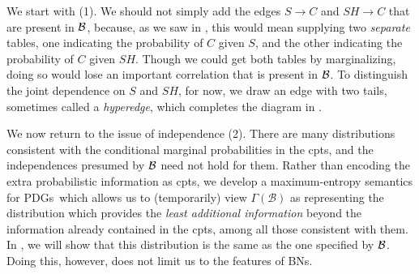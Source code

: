 \documentclass{article}
\newcommand{\MN}{PDG}
\newcommand{\MNs}{\MN s}
\numberwithin{equation}{section}
\begin{document}
\begin{example}[emulating a BN]
		We start with (1). We should not simply add the edges $S \to C$ and $SH \to C$ that are present in $\cal B$, because, as we saw in , this would mean supplying two \emph{separate} tables, one indicating the probability of $C$ given $S$, and the other indicating the probability of $C$ given $\mathit{SH}$. Though we could get both tables by marginalizing, doing so would lose an important correlation that is present in $\cal B$.  
		To distinguish the joint dependence on $S$ and $\mathit{SH}$, for now, we draw an edge with two tails, sometimes called a \emph{hyperedge}, which completes the diagram in .
	\end{example}

	We now return to the issue of independence (2). There are many distributions consistent with the conditional marginal probabilities in the cpts, and the independences presumed by $\cal B$ need not hold for them. Rather than encoding the extra probabilistic information as cpts, we develop a maximum-entropy semantics for \MNs\, which allows us to (temporarily) view  $\Gamma(\mathcal B)$ as representing the distribution which provides the \emph{least additional information} beyond the information already contained in the cpts, among all those consistent with them. In , we will show that this distribution is the same as the one specified by $\cal B$.
	Doing this, however, does not limit us to the features of BNs. 
	
\end{document}
